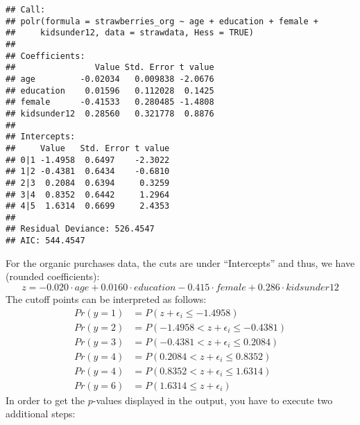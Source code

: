 \documentclass[
]{article}
\newenvironment{Shaded}{\begin{snugshade}}{\end{snugshade}}
\newcommand{\DataTypeTok}[1]{\textcolor[rgb]{0.13,0.29,0.53}{#1}}
\newcommand{\KeywordTok}[1]{\textcolor[rgb]{0.13,0.29,0.53}{\textbf{#1}}}
\newcommand{\NormalTok}[1]{#1}
\newcommand{\OperatorTok}[1]{\textcolor[rgb]{0.81,0.36,0.00}{\textbf{#1}}}
\newcommand{\OtherTok}[1]{\textcolor[rgb]{0.56,0.35,0.01}{#1}}
\newcommand{\StringTok}[1]{\textcolor[rgb]{0.31,0.60,0.02}{#1}}
\begin{document}
\begin{Shaded}
\end{Shaded}

\begin{verbatim}
## Call:
## polr(formula = strawberries_org ~ age + education + female + 
##     kidsunder12, data = strawdata, Hess = TRUE)
## 
## Coefficients:
##                Value Std. Error t value
## age         -0.02034   0.009838 -2.0676
## education    0.01596   0.112028  0.1425
## female      -0.41533   0.280485 -1.4808
## kidsunder12  0.28560   0.321778  0.8876
## 
## Intercepts:
##     Value   Std. Error t value
## 0|1 -1.4958  0.6497    -2.3022
## 1|2 -0.4381  0.6434    -0.6810
## 2|3  0.2084  0.6394     0.3259
## 3|4  0.8352  0.6442     1.2964
## 4|5  1.6314  0.6699     2.4353
## 
## Residual Deviance: 526.4547 
## AIC: 544.4547
\end{verbatim}

For the organic purchases data, the cuts are under ``Intercepts'' and thus, we have (rounded coefficients):
\[z =  -0.020 \cdot age  +0.0160 \cdot education -0.415 \cdot female +0.286 \cdot kidsunder12\]
The cutoff points can be interpreted as follows:
\[\begin{align*}
    Pr(y=1) &= P(z+\epsilon_i \leq -1.4958)\\
    Pr(y=2) &= P(-1.4958 < z+\epsilon_i \leq -0.4381)\\
    Pr(y=3) &= P(-0.4381 < z+\epsilon_i \leq  0.2084)\\
    Pr(y=4) &= P(0.2084 < z+\epsilon_i \leq 0.8352)\\
    Pr(y=4) &= P(0.8352 < z+\epsilon_i \leq 1.6314)\\
    Pr(y=6) &= P(1.6314 \leq z+\epsilon_i )
\end{align*}\]
In order to get the \(p\)-values displayed in the output, you have to execute two additional steps:
\end{document}
